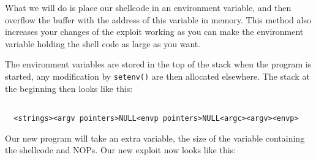 \documentclass[a4paper]{article}
\begin{document}
What we will do is place our shellcode in an environment variable, and then overflow the buffer with the address of this variable in memory. This method also increases your changes of the exploit working as you can make the environment variable holding the shell code as large as you want.

The environment variables are stored in the top of the stack when the program is started, any modification by \texttt{setenv()} are then allocated elsewhere. The stack at the beginning then looks like this:


\begin{listing}[ht]
\begin{verbatim}

  <strings><argv pointers>NULL<envp pointers>NULL<argc><argv><envp>

\end{verbatim}
\label{listing:1}
\end{listing}

Our new program will take an extra variable, the size of the variable containing the shellcode and NOPs. Our new exploit now looks like this:
\end{document}
